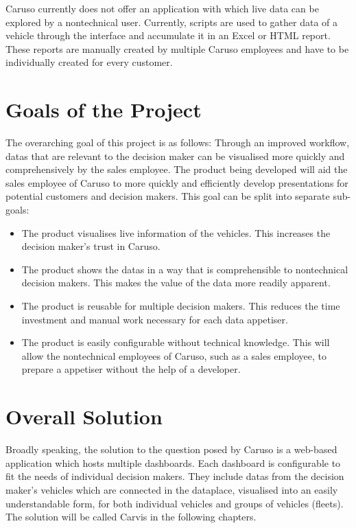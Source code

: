 Caruso currently does not offer an application with which live data can be explored by a \gls{nontechnical} user. Currently, scripts are used to gather data of a vehicle through the interface and accumulate it in an Excel or HTML report. These reports are manually created by multiple Caruso employees and have to be individually created for every customer.

\section{Goals of the Project}
The overarching goal of this project is as follows: Through an improved workflow, \glspl{data} that are relevant to the decision maker can be visualised more quickly and comprehensively by the sales employee. The product being developed will aid the sales employee of Caruso to more quickly and efficiently develop presentations for potential customers and decision makers. This goal can be split into separate sub-goals: 
\begin{itemize}
  \item The product visualises live information of the vehicles. This increases the decision maker's trust in Caruso.
  \item The product shows the \glspl{data} in a way that is comprehensible to \gls{nontechnical} decision makers. This makes the value of the data more readily apparent.
  \item The product is reusable for multiple decision makers. This reduces the time investment and manual work necessary for each data \gls{appetiser}.
  \item The product is easily configurable without technical knowledge. This will allow the \gls{nontechnical} employees of Caruso, such as a sales employee, to prepare a \gls{appetiser} without the help of a developer.
\end{itemize}

\section{Overall Solution}
Broadly speaking, the solution to the question posed by Caruso is a web-based application which hosts multiple dashboards. Each dashboard is configurable to fit the needs of individual decision makers. They include \glspl{data} from the decision maker's vehicles which are connected in the \gls{dataplace}, visualised into an easily understandable form, for both individual vehicles and groups of vehicles (fleets). The solution will be called Carvis in the following chapters.